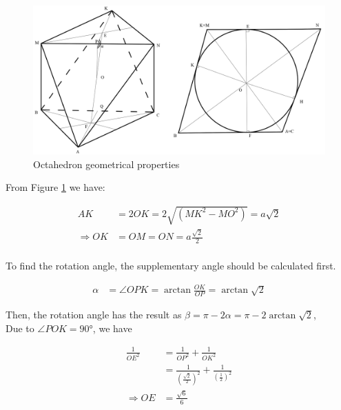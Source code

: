 \begin{figure}[h]
\centering
	\includegraphics[width=\textwidth]{image/octaGeo11.png}
%	
	\caption{Octahedron geometrical properties}
	\label{fig:octaGeo1}
\end{figure}



\noindent From Figure \ref{fig:octaGeo1} we have:

\begin{equation*} 
\label{octa:eq0}
\begin{split}
AK & = 2OK = 2\sqrt{(MK^2-MO^2)} = a\sqrt{2}\\
\Rightarrow OK & = OM = ON = a\frac{\sqrt{2}}{2}\\
\end{split}
\end{equation*}

\noindent To find the rotation angle, the supplementary angle should be calculated first. 

\begin{equation*} 
\label{octa:eq2}
\begin{split}
\alpha & = \angle OPK = \arctan{\frac{OK}{OP}} = \arctan{\sqrt{2}}
\end{split}
\end{equation*}

\noindent Then, the rotation angle has the result as  $\beta = \pi-2\alpha = \pi-2\arctan{\sqrt{2}}$, \\

\noindent Due to $\angle POK=\ang{90}$, we have

\begin{equation*} 
\label{octa:eq3}
\begin{split}
\frac{1}{OE^2} & = \frac{1}{OP^2}+\frac{1}{OK^2}\\
			   & = \frac{1}{(\frac{\sqrt{2}}{2})^2}+\frac{1}{(\frac{1}{2})^2}\\
\Rightarrow OE & = \frac{\sqrt{6}}{6}
\end{split}
\end{equation*}

